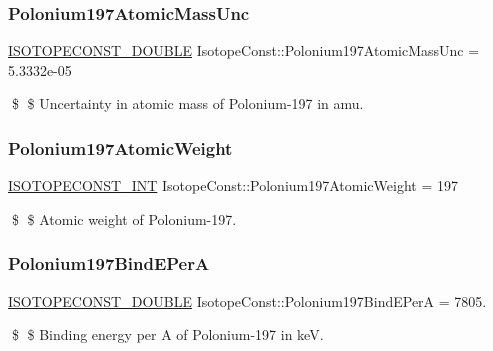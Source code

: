 \subsubsection{\texorpdfstring{Polonium197\+Atomic\+Mass\+Unc}{Polonium197AtomicMassUnc}}
{\footnotesize\ttfamily \mbox{\hyperlink{group___isotope_const-_macros_ga8f45a7272ce02c0b4c65c44636ed719a}{I\+S\+O\+T\+O\+P\+E\+C\+O\+N\+S\+T\+\_\+\+D\+O\+U\+B\+LE}} Isotope\+Const\+::\+Polonium197\+Atomic\+Mass\+Unc = 5.\+3332e-\/05}

\$ \$ Uncertainty in atomic mass of Polonium-\/197 in amu. \mbox{\label{group___isotope_const-_polonium-_po197_ga053b075c73e7a789bc44ed624dcf2053}} 
\subsubsection{\texorpdfstring{Polonium197\+Atomic\+Weight}{Polonium197AtomicWeight}}
{\footnotesize\ttfamily \mbox{\hyperlink{group___isotope_const-_macros_ga5f18360b3e99483a35c32d789e62621c}{I\+S\+O\+T\+O\+P\+E\+C\+O\+N\+S\+T\+\_\+\+I\+NT}} Isotope\+Const\+::\+Polonium197\+Atomic\+Weight = 197}

\$ \$ Atomic weight of Polonium-\/197. \mbox{\label{group___isotope_const-_polonium-_po197_ga9dfe50073cf5c08e5af848aeaea9d64d}} 
\subsubsection{\texorpdfstring{Polonium197\+Bind\+E\+PerA}{Polonium197BindEPerA}}
{\footnotesize\ttfamily \mbox{\hyperlink{group___isotope_const-_macros_ga8f45a7272ce02c0b4c65c44636ed719a}{I\+S\+O\+T\+O\+P\+E\+C\+O\+N\+S\+T\+\_\+\+D\+O\+U\+B\+LE}} Isotope\+Const\+::\+Polonium197\+Bind\+E\+PerA = 7805.}

\$ \$ Binding energy per A of Polonium-\/197 in keV. \mbox{\label{group___isotope_const-_polonium-_po197_gaa9d8b80581aa8f99c032097ef113b03a}} 

